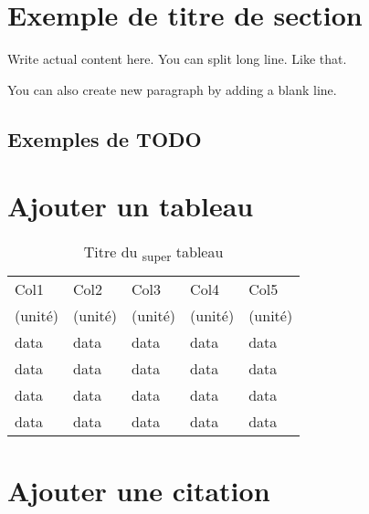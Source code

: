 \section{Exemple de titre de section}

Write actual content here.
You can split long line.
Like that.

You can also create new paragraph by adding a blank line.

\subsection{Exemples de TODO}


\section{Ajouter un tableau}

\begin{table}[h!]
    \centering
    \begin{tabular}{lllll}
        \hline
        Col1    & Col2    & Col3    & Col4    & Col5\\
        (unité) & (unité) & (unité) & (unité) & (unité)\\
        \hline\hline
        data & data & data & data & data\\
        data & data & data & data & data\\
        data & data & data & data & data\\
        data & data & data & data & data\\
        \hline
    \end{tabular}
    \caption{Titre du \textsubscript{super} tableau}
    \label{tab:template-Vout}
\end{table}

\section{Ajouter une citation}

